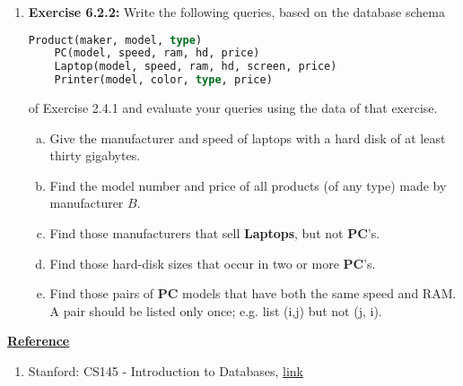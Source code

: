 \documentclass[12pt]{article}
\begin{document}
\begin{enumerate}[1.]
    \item \textbf{Exercise 6.2.2:} Write the following queries, based on the database
    schema

    \begin{lstlisting}[language=SQL]
    Product(maker, model, type)
    PC(model, speed, ram, hd, price)
    Laptop(model, speed, ram, hd, screen, price)
    Printer(model, color, type, price)
    \end{lstlisting}

    \bigskip

    of Exercise 2.4.1 and evaluate your queries using the data of that exercise.

    \bigskip

    \begin{enumerate}[a)]
        \item Give the manufacturer and speed of laptops with a hard disk of at least
        thirty gigabytes.
        \item Find the model number and price of all products (of any type) made by
        manufacturer $B$.
        \item Find those manufacturers that sell \textbf{Laptops}, but not \textbf{PC}'s.
        \item Find those hard-disk sizes that occur in two or more \textbf{PC}'s.
        \item Find those pairs of \textbf{PC} models that have both the same speed
        and RAM. A pair should be listed only once; e.g. list (i,j) but not (j, i).
    \end{enumerate}


\end{enumerate}

\bigskip

\underline{\textbf{Reference}}

\bigskip

\begin{enumerate}[1)]
    \item Stanford: CS145 - Introduction to Databases, \href{http://infolab.stanford.edu/~ullman/fcdb/aut07/index.html}{link}
\end{enumerate}
\end{document}
